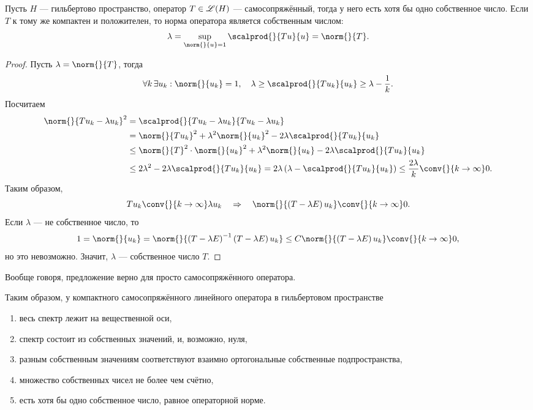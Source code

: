 \begin{prop}
Пусть $H$ --- гильбертово пространство, оператор $T \in \mathscr{L}(H)$ --- самосопряжённый, тогда у него есть хотя бы одно собственное число. Если $T$ к тому же компактен и положителен, то норма оператора является собственным числом:
$$ \lambda = \sup_{\norm{}{u} = 1} \scalprod{}{Tu}{u} = \norm{}{T}.$$
\end{prop}
\begin{proof} Пусть $\lambda = \norm{}{T}$, тогда
$$ \forall k \, \exists u_k : \norm{}{u_k} = 1, \quad \lambda \geq \scalprod{}{Tu_k}{u_k} \geq \lambda - \frac {1} {k}.$$
Посчитаем
\begin{align*}
\norm{}{T u_k - \lambda u_k}^2 &= \scalprod{}{Tu_k - \lambda u_k}{Tu_k - \lambda u_k} \\
& = \norm{}{Tu_k}^2 + \lambda^2 \norm{}{u_k}^2 - 2 \lambda \scalprod{}{Tu_k}{u_k} \\
&\leq \norm{}{T}^2 \cdot \norm{}{u_k}^2 + \lambda^2 \norm{}{u_k} - 2 \lambda \scalprod{}{Tu_k}{u_k} \\
&\leq 2 \lambda^2 - 2 \lambda \scalprod{}{Tu_k}{u_k} = 2\lambda \left( \lambda - \scalprod{}{Tu_k}{u_k} \right) \leq \frac {2\lambda}{k} \conv{}{k \to \infty} 0.
\end{align*}
Таким образом,
$$ T u_k \conv{}{k \to \infty} \lambda u_k \quad \Rightarrow \quad \norm{}{\left( T - \lambda E \right) u_k} \conv{}{k \to \infty} 0.$$
Если $\lambda$ --- не собственное число, то
$$ 1 = \norm{}{u_k} = \norm{}{\left( T - \lambda E\right)^{-1} \left( T - \lambda E \right) u_k } \leq C \norm{}{\left( T - \lambda E \right) u_k} \conv{}{k \to \infty} 0,$$
но это невозможно. Значит, $\lambda$ --- собственное число $T$.

\end{proof} %
\begin{note}
Вообще говоря, предложение верно для просто самосопряжённого оператора.
\end{note}

Таким образом, у компактного самосопряжённого линейного оператора в гильбертовом пространстве
\begin{enumerate}
\item весь спектр лежит на вещественной оси,
\item спектр состоит из собственных значений, и, возможно, нуля,
\item разным собственным значениям соответствуют взаимно ортогональные собственные подпространства,
\item множество собственных чисел не более чем счётно,
\item есть хотя бы одно собственное число, равное операторной норме.
\end{enumerate}

